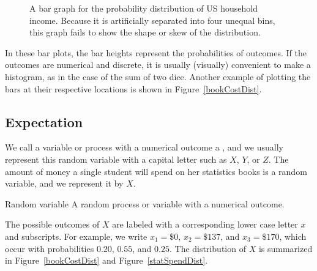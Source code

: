\begin{figure}[h]
\centering
\caption{A bar graph for the probability distribution of US household income. Because it is artificially separated into four unequal bins, this graph fails to show the shape or skew of the distribution.}
\label{usHouseholdIncomeDistBar}
\end{figure}

In these bar plots, the bar heights represent the probabilities of outcomes. If the outcomes are numerical and discrete, it is usually (visually) convenient to make a histogram, as in the case of the sum of two dice. Another example of plotting the bars at their respective locations is shown in Figure~\ref{bookCostDist}.



\D{\newpage}

\subsection{Expectation}


We call a variable or process with a numerical outcome a , and we usually represent this random variable with a capital letter such as $X$, $Y$, or $Z$. The amount of money a single student will spend on her statistics books is a random variable, and we represent it by $X$.

\begin{onebox}{Random variable}
A random process or variable with a numerical outcome.\end{onebox}

The possible outcomes of $X$ are labeled with a corresponding lower case letter $x$ and subscripts. For example, we write $x_1=\$0$, $x_2=\$137$, and $x_3=\$170$, which occur with probabilities $0.20$, $0.55$, and $0.25$. The distribution of $X$ is summarized in Figure~\ref{bookCostDist} and Figure~\ref{statSpendDist}.

